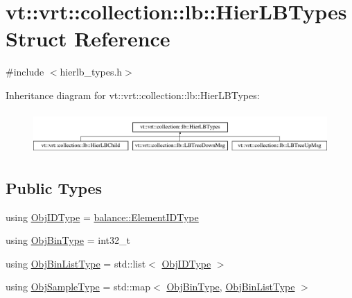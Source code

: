 \hypertarget{structvt_1_1vrt_1_1collection_1_1lb_1_1_hier_l_b_types}{}\section{vt\+:\+:vrt\+:\+:collection\+:\+:lb\+:\+:Hier\+L\+B\+Types Struct Reference}
\label{structvt_1_1vrt_1_1collection_1_1lb_1_1_hier_l_b_types}


{\ttfamily \#include $<$hierlb\+\_\+types.\+h$>$}

Inheritance diagram for vt\+:\+:vrt\+:\+:collection\+:\+:lb\+:\+:Hier\+L\+B\+Types\+:\begin{figure}[H]
\begin{center}
\leavevmode
\includegraphics[height=1.623188cm]{structvt_1_1vrt_1_1collection_1_1lb_1_1_hier_l_b_types}
\end{center}
\end{figure}
\subsection*{Public Types}
\begin{DoxyCompactItemize}
\item 
using \hyperlink{structvt_1_1vrt_1_1collection_1_1lb_1_1_hier_l_b_types_a52254678ca07c280dba927d688a0202f}{Obj\+I\+D\+Type} = \hyperlink{namespacevt_1_1vrt_1_1collection_1_1balance_a14c8d2c972f2913aa3f1636e5be0a120}{balance\+::\+Element\+I\+D\+Type}
\item 
using \hyperlink{structvt_1_1vrt_1_1collection_1_1lb_1_1_hier_l_b_types_a280971a7971a7fc215214e81ba3b12b5}{Obj\+Bin\+Type} = int32\+\_\+t
\item 
using \hyperlink{structvt_1_1vrt_1_1collection_1_1lb_1_1_hier_l_b_types_ac1e6fedb923b2a16f440a61e6dc94173}{Obj\+Bin\+List\+Type} = std\+::list$<$ \hyperlink{structvt_1_1vrt_1_1collection_1_1lb_1_1_hier_l_b_types_a52254678ca07c280dba927d688a0202f}{Obj\+I\+D\+Type} $>$
\item 
using \hyperlink{structvt_1_1vrt_1_1collection_1_1lb_1_1_hier_l_b_types_a597a60d517207b90e8c7984eac434e8f}{Obj\+Sample\+Type} = std\+::map$<$ \hyperlink{structvt_1_1vrt_1_1collection_1_1lb_1_1_hier_l_b_types_a280971a7971a7fc215214e81ba3b12b5}{Obj\+Bin\+Type}, \hyperlink{structvt_1_1vrt_1_1collection_1_1lb_1_1_hier_l_b_types_ac1e6fedb923b2a16f440a61e6dc94173}{Obj\+Bin\+List\+Type} $>$
\end{DoxyCompactItemize}


